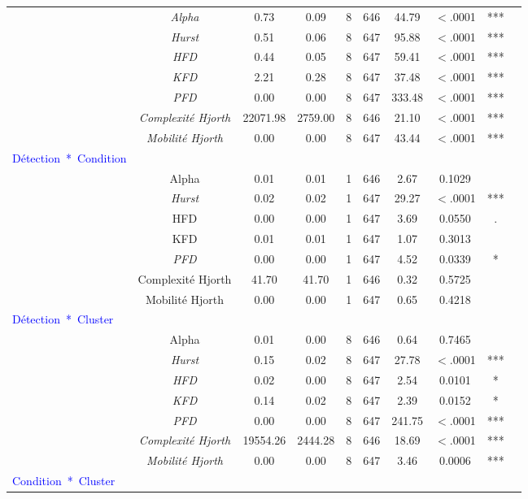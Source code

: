 \begin{table}[!t]
\begin{tabular}{|l|*{9}{c|}}
\hline
& \textit{Alpha} & 0.73 & 0.09 & 8 & 646 & 44.79 & $<$.0001 & *** \\ 
& \textit{Hurst} & 0.51 & 0.06 & 8 & 647 & 95.88 & $<$.0001 & *** \\ 
& \textit{HFD} & 0.44 & 0.05 & 8 & 647 & 59.41 & $<$.0001 & *** \\ 
& \textit{KFD} & 2.21 & 0.28 & 8 & 647 & 37.48 & $<$.0001 & *** \\ 
& \textit{PFD} & 0.00 & 0.00 & 8 & 647 & 333.48 & $<$.0001 & *** \\ 
& \textit{Complexité Hjorth} & 22071.98 & 2759.00 & 8 & 646 & 21.10 & $<$.0001 & *** \\ 
& \textit{Mobilité Hjorth} & 0.00 & 0.00 & 8 & 647 & 43.44 & $<$.0001 & *** \\ 
\hline
\textcolor{blue}{Détection~*~Condition} & & & & & & & & \\ 
\hline
& Alpha & 0.01 & 0.01 & 1 & 646 & 2.67 & 0.1029 & \\ 
& \textit{Hurst} & 0.02 & 0.02 & 1 & 647 & 29.27 & $<$.0001 & *** \\ 
& HFD & 0.00 & 0.00 & 1 & 647 & 3.69 & 0.0550 & . \\ 
& KFD & 0.01 & 0.01 & 1 & 647 & 1.07 & 0.3013 & \\ 
& \textit{PFD} & 0.00 & 0.00 & 1 & 647 & 4.52 & 0.0339 & *\\ 
& Complexité Hjorth & 41.70 & 41.70 & 1 & 646 & 0.32 & 0.5725 & \\ 
& Mobilité Hjorth & 0.00 & 0.00 & 1 & 647 & 0.65 & 0.4218 & \\ 
\hline
\textcolor{blue}{Détection~*~Cluster} & & & & & & & & \\ 
\hline
& Alpha & 0.01 & 0.00 & 8 & 646 & 0.64 & 0.7465 & \\ 
& \textit{Hurst} & 0.15 & 0.02 & 8 & 647 & 27.78 & $<$.0001 & *** \\ 
& \textit{HFD} & 0.02 & 0.00 & 8 & 647 & 2.54 & 0.0101 & * \\ 
& \textit{KFD} & 0.14 & 0.02 & 8 & 647 & 2.39 & 0.0152 & * \\ 
& \textit{PFD} & 0.00 & 0.00 & 8 & 647 & 241.75 & $<$.0001 & *** \\ 
& \textit{Complexité Hjorth} & 19554.26 & 2444.28 & 8 & 646 & 18.69 & $<$.0001 & *** \\ 
& \textit{Mobilité Hjorth} & 0.00 & 0.00 & 8 & 647 & 3.46 & 0.0006 & *** \\ 
\hline
\textcolor{blue}{Condition~*~Cluster} & & & & & & & & \\ 

\end{tabular}
\end{table}
